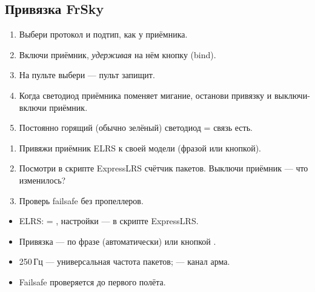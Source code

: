 \subsection{Привязка FrSky}

\begin{enumerate}
  \item Выбери протокол и подтип, как у приёмника.
  \item Включи приёмник, \emph{удерживая} на нём кнопку  (bind).
  \item На пульте выбери \menu{[Bind]} --- пульт запищит.
  \item Когда светодиод приёмника поменяет мигание, останови привязку и выключи-включи приёмник.
  \item Постоянно горящий (обычно зелёный) светодиод = связь есть.
\end{enumerate}

\begin{tryit}
\begin{enumerate}
  \item Привяжи приёмник ELRS к своей модели (фразой или кнопкой).
  \item Посмотри в скрипте ExpressLRS счётчик пакетов. Выключи приёмник --- что изменилось?
  \item Проверь failsafe без пропеллеров.
\end{enumerate}
\end{tryit}

\begin{summary}
\begin{itemize}
  \item ELRS:  = , настройки --- в скрипте ExpressLRS.
  \item Привязка --- по фразе (автоматически) или кнопкой \menu{[Bind]}.
  \item 250\,Гц --- универсальная частота пакетов;  --- канал арма.
  \item Failsafe проверяется до первого полёта.
\end{itemize}
\end{summary}
